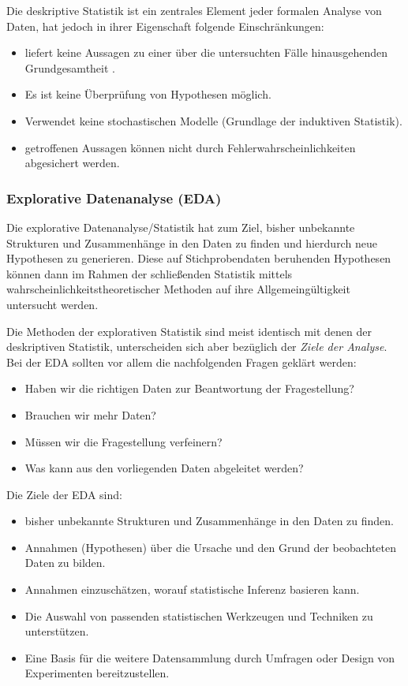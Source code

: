 \documentclass[]{article}
\providecommand{\tightlist}{%
  \setlength{\itemsep}{0pt}\setlength{\parskip}{0pt}}
\begin{document}
Die deskriptive Statistik ist ein zentrales Element jeder formalen
Analyse von Daten, hat jedoch in ihrer Eigenschaft folgende
Einschränkungen:

\begin{itemize}
\tightlist
\item
  liefert keine Aussagen zu einer über die untersuchten Fälle
  hinausgehenden Grundgesamtheit .
\item
  Es ist keine Überprüfung von Hypothesen möglich.
\item
  Verwendet keine stochastischen Modelle (Grundlage der induktiven
  Statistik).
\item
  getroffenen Aussagen können nicht durch Fehlerwahrscheinlichkeiten
  abgesichert werden.
\end{itemize}

\subsubsection*{Explorative Datenanalyse
(EDA)}\label{explorative-datenanalyse-eda}

Die explorative Datenanalyse/Statistik hat zum Ziel, bisher unbekannte
Strukturen und Zusammenhänge in den Daten zu finden und hierdurch neue
Hypothesen zu generieren. Diese auf Stichprobendaten beruhenden
Hypothesen können dann im Rahmen der schließenden Statistik mittels
wahrscheinlichkeitstheoretischer Methoden auf ihre Allgemeingültigkeit
untersucht werden.

Die Methoden der explorativen Statistik sind meist identisch mit denen
der deskriptiven Statistik, unterscheiden sich aber bezüglich der
\emph{Ziele der Analyse}. Bei der EDA sollten vor allem die
nachfolgenden Fragen geklärt werden:

\begin{itemize}
\tightlist
\item
  Haben wir die richtigen Daten zur Beantwortung der Fragestellung?
\item
  Brauchen wir mehr Daten?
\item
  Müssen wir die Fragestellung verfeinern?
\item
  Was kann aus den vorliegenden Daten abgeleitet werden?
\end{itemize}

Die Ziele der EDA sind:

\begin{itemize}
\tightlist
\item
  bisher unbekannte Strukturen und Zusammenhänge in den Daten zu finden.
\item
  Annahmen (Hypothesen) über die Ursache und den Grund der beobachteten
  Daten zu bilden.
\item
  Annahmen einzuschätzen, worauf statistische Inferenz basieren kann.
\item
  Die Auswahl von passenden statistischen Werkzeugen und Techniken zu
  unterstützen.
\item
  Eine Basis für die weitere Datensammlung durch Umfragen oder Design
  von Experimenten bereitzustellen.
\end{itemize}
\end{document}

